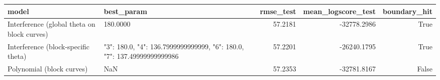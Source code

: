 \begin{tabular}{llrrr}
\toprule
model & best_param & rmse_test & mean_logscore_test & boundary_hit \\
\midrule
Interference (global theta on block curves) & 180.0000 & 57.2181 & -32778.2986 & True \\
Interference (block-specific theta) & {"3": 180.0, "4": 136.7999999999999, "6": 180.0, "7": 137.49999999999986} & 57.2201 & -26240.1795 & True \\
Polynomial (block curves) & NaN & 57.2353 & -32781.8167 & False \\
\bottomrule
\end{tabular}
